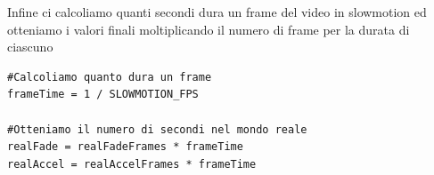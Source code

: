 \documentclass[main.tex]{subfiles}
\begin{document}
Infine ci calcoliamo quanti secondi dura un frame del video in slowmotion ed otteniamo i valori finali moltiplicando il numero di frame per la durata di ciascuno
\begin{lstlisting}
#Calcoliamo quanto dura un frame
frameTime = 1 / SLOWMOTION_FPS

#Otteniamo il numero di secondi nel mondo reale
realFade = realFadeFrames * frameTime
realAccel = realAccelFrames * frameTime
\end{lstlisting}
\end{document}
